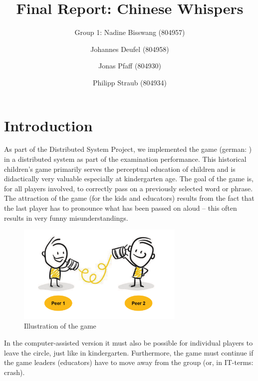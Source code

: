 \documentclass[runningheads]{llncs}
\begin{document}
\title{Final Report: Chinese Whispers}

\author{Group 1: Nadine Bisswang (804957) \and Johannes Deufel (804958) \and Jonas Pfaff (804930) \and Philipp Straub (804934)}


%
\maketitle              %
\section{Introduction}
    As part of the Distributed System Project, we implemented the game  (german: ) in a distributed system as part of the examination performance. 
    This historical children's game primarily serves the perceptual education of children and is didactically very valuable especially at kindergarten age. The goal of the game is, for all players involved, to correctly pass on a previously selected word or phrase. The attraction of the game (for the kids and educators) results from the fact that the last player has to pronounce what has been passed on aloud -- this often results in very funny misunderstandings. 
    
        \begin{figure}
        \center 
        \includegraphics[width=8cm]{Chinese Whispers.pdf}
        \caption{Illustration of the game} \label{fig:chinese-whispers}
        \end{figure}
        
    In the computer-assisted version it must also be possible for individual players to leave the circle, just like in kindergarten. Furthermore, the game must continue if the game leaders (educators) have to move away from the group (or, in IT-terms: crash).
    
\end{document}
